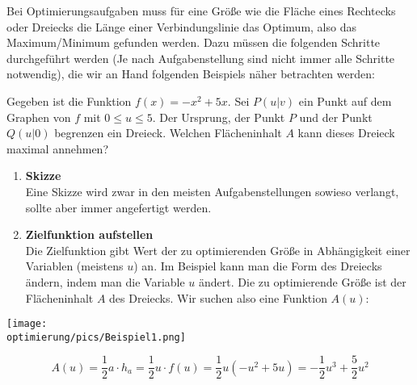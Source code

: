 Bei Optimierungsaufgaben muss für eine Größe wie die Fläche eines Rechtecks oder Dreiecks die Länge einer Verbindungslinie das Optimum, also das Maximum/Minimum gefunden werden. Dazu müssen die folgenden Schritte durchgeführt werden (Je nach Aufgabenstellung sind nicht immer alle Schritte notwendig), die wir an Hand folgenden Beispiels näher betrachten werden:\\
\begin{minipage}{\textwidth}
	\begin{minipage}{.5\textwidth}\raggedright
		Gegeben ist die Funktion \(f(x)=-x^2+5x\). Sei \(P(u\vert v)\) ein Punkt auf dem Graphen von \(f\) mit \(0\leq u\leq 5\). Der Ursprung, der Punkt \(P\) und der Punkt \(Q(u\vert 0)\) begrenzen ein Dreieck. Welchen Flächeninhalt \(A\) kann dieses Dreieck maximal annehmen?\\
		\begin{enumerate}
			\item \textbf{Skizze}\\
			\textcolor{loes}{Eine Skizze wird zwar in den meisten Aufgabenstellungen sowieso verlangt, sollte aber immer angefertigt werden.}
			\item \textbf{Zielfunktion aufstellen}\\
			\textcolor{loes}{Die Zielfunktion gibt Wert der zu optimierenden Größe in Abhängigkeit einer Variablen (meistens \(u\)) an. Im Beispiel kann man die Form des Dreiecks ändern, indem man die Variable \(u\) ändert. Die zu optimierende Größe ist der Flächeninhalt \(A\) des Dreiecks. Wir suchen also eine Funktion \(A(u)\):}\\
		\end{enumerate}
	\end{minipage}
	\begin{minipage}{.5\textwidth}
		\texttt{[image: \\optimierung/pics/Beispiel1.png]}
	\end{minipage}
\end{minipage}
\textcolor{loes}{\[A(u)=\frac{1}{2}a\cdot h_a=\frac{1}{2}u\cdot f(u)=\frac{1}{2}u\left(-u^2+5u\right)=-\frac{1}{2}u^3+\frac{5}{2}u^2\]}
